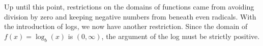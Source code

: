 \medskip

Up until this point, restrictions on the domains of functions came from avoiding division by zero and keeping negative numbers from beneath even radicals.  With the introduction of logs, we now have another restriction.  Since the domain of $f(x) = \log_{b}(x)$ is $(0, \infty)$, the argument of the log must be strictly positive.  

\medskip

